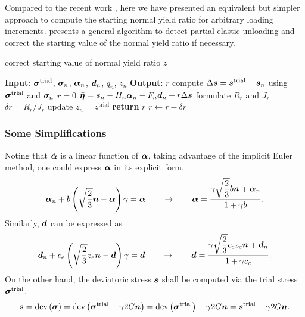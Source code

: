 Compared to the recent work \cite{Hashiguchi2018,Anjiki2019}, here we have presented an equivalent but simpler approach to compute the starting normal yield ratio for arbitrary loading increments.
 presents a general algorithm to detect partial elastic unloading and correct the starting value of the normal yield ratio if necessary.
\begin{breakablealgorithm}
    \caption{correct starting value of normal yield ratio $z$}\label{algo:loading_criterion}
    \begin{algorithmic}[1]
        \State \textbf{Input}: $\bm{\sigma}^\text{trial}$, $\bm{\sigma}_n$, $\bm{\alpha}_{n}$, $\bm{d}_n$, $q_n$, $z_n$
        \State \textbf{Output}: $r$
        \State compute $\Delta\bm{s}=\bm{s}^\text{trial}-\bm{s}_n$ using $\bm{\sigma}^\text{trial}$ and $\bm{\sigma}_n$
        \State $r=0$
        \State $\bar{\bm{\eta}}=\bm{s}_n-H_n\bm{\alpha}_n-F_n\bm{d}_n+r\Delta\bm{s}$
        \State formulate $R_r$ and $J_r$
        \State $\delta{}r=R_r/J_r$
        \State update $z_{n}=z^\text{trial}$
        \EndIf
        \State \textbf{return} $r$
        \EndIf
        \State $r\leftarrow{}r-\delta{}r$
        \EndWhile
    \end{algorithmic}
\end{breakablealgorithm}
\subsubsection{Some Simplifications}
Noting that $\dot{\bm{\alpha}}$ is a linear function of $\bm{\alpha}$, taking advantage of the implicit Euler method, one could express $\bm{\alpha}$ in its explicit form.
\begin{gather}\label{eq:explicit_alpha}
    \bm{\alpha}_n+b\left(\sqrt{\dfrac{2}{3}}\bm{n}-\bm{\alpha}\right)\gamma=\bm{\alpha}\qquad\rightarrow\qquad
    \bm{\alpha}=\dfrac{\gamma\sqrt{\dfrac{2}{3}}b\bm{n}+\bm{\alpha}_n}{1+\gamma{}b}.
\end{gather}
Similarly, $\bm{d}$ can be expressed as
\begin{gather}\label{eq:explicit_d}
    \bm{d}_n+c_e\left(\sqrt{\dfrac{2}{3}}z_e\bm{n}-\bm{d}\right)\gamma=\bm{d}\qquad\rightarrow\qquad\bm{d}=\dfrac{\gamma{}\sqrt{\dfrac{2}{3}}c_ez_e\bm{n}+\bm{d}_n}{1+\gamma{}c_e}.
\end{gather}
On the other hand, the deviatoric stress $\bm{s}$ shall be computed via the trial stress $\bm{\sigma}^\text{trial}$,
\begin{gather}
    \bm{s}=\text{dev}\left(\bm{\sigma}\right)=\text{dev}\left(\bm{\sigma}^\text{trial}-\gamma2G\bm{n}\right)=\text{dev}\left(\bm{\sigma}^\text{trial}\right)-\gamma2G\bm{n}=\bm{s}^\text{trial}-\gamma2G\bm{n}.
\end{gather}

